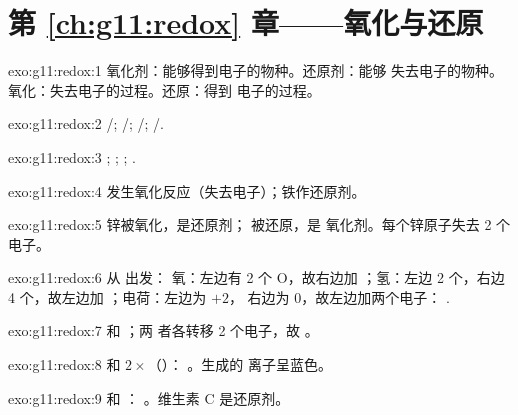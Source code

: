 \section*{第 \ref{ch:g11:redox} 章——氧化与还原}

\begin{solution}{exo:g11:redox:1}
氧化剂：能够得到电子的物种。还原剂：能够
失去电子的物种。氧化：失去电子的过程。还原：得到
电子的过程。
\end{solution}

\begin{solution}{exo:g11:redox:2}
/; /; /;
/.
\end{solution}

\begin{solution}{exo:g11:redox:3}
; ;
; .
\end{solution}

\begin{solution}{exo:g11:redox:4}
发生氧化反应（失去电子）；铁作还原剂。
\end{solution}

\begin{solution}{exo:g11:redox:5}
锌被氧化，是还原剂； 被还原，是
氧化剂。每个锌原子失去 2 个电子。
\end{solution}

\begin{solution}{exo:g11:redox:6}
从  出发：%
氧：左边有 2 个 O，故右边加 ；氢：左边
2 个，右边 4 个，故左边加 ；电荷：左边为 $+2$，
右边为 0，故左边加两个电子：
.
\end{solution}

\begin{solution}{exo:g11:redox:7}
 和 ；两
者各转移 2 个电子，故 。
\end{solution}

\begin{solution}{exo:g11:redox:8}
 和 $2\times$（）：
。生成的  离子呈蓝色。
\end{solution}

\begin{solution}{exo:g11:redox:9}
 和 ：
。维生素 C 是还原剂。
\end{solution}

